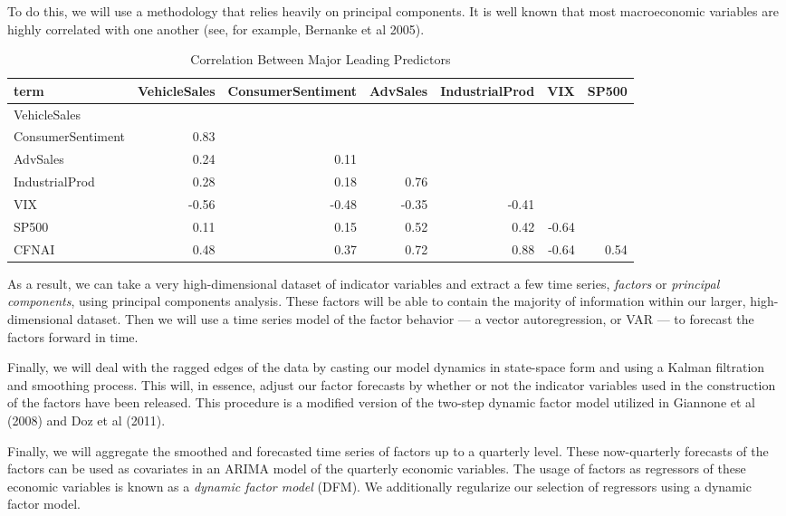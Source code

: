 \documentclass[11pt, letterpaper]{article}\usepackage[]{graphicx}\usepackage[]{color}
\begin{document}
To do this, we will use a methodology that relies heavily on principal components. It is well known that most macroeconomic variables are highly correlated with one another (see, for example, Bernanke et al 2005).
\begin{table}[H]
\centering
\begingroup\scriptsize
\begin{tabular}{lrrrrrr}
  \hline
term & VehicleSales & ConsumerSentiment & AdvSales & IndustrialProd & VIX & SP500 \\ 
  \hline
VehicleSales &  &  &  &  &  &  \\ 
  ConsumerSentiment & 0.83 &  &  &  &  &  \\ 
  AdvSales & 0.24 & 0.11 &  &  &  &  \\ 
  IndustrialProd & 0.28 & 0.18 & 0.76 &  &  &  \\ 
  VIX & -0.56 & -0.48 & -0.35 & -0.41 &  &  \\ 
  SP500 & 0.11 & 0.15 & 0.52 & 0.42 & -0.64 &  \\ 
  CFNAI & 0.48 & 0.37 & 0.72 & 0.88 & -0.64 & 0.54 \\ 
   \hline
\end{tabular}
\endgroup
\caption{Correlation Between Major Leading Predictors} 
\end{table}

As a result, we can take a very high-dimensional dataset of indicator variables and extract a few time series, \textit{factors} or \textit{principal components}, using principal components analysis. These factors will be able to contain the majority of information within our larger, high-dimensional dataset. Then we will use a time series model of the factor behavior --- a vector autoregression, or VAR --- to forecast the factors forward in time. 

Finally, we will deal with the ragged edges of the data by casting our model dynamics in state-space form and using a Kalman filtration and smoothing process. This will, in essence, adjust our factor forecasts by whether or not the indicator variables used in the construction of the factors have been released. This procedure is a modified version of the two-step dynamic factor model utilized in Giannone et al (2008) and Doz et al (2011).

Finally, we will aggregate the smoothed and forecasted time series of factors up to a quarterly level. These now-quarterly forecasts of the factors can be used as covariates in an ARIMA model of the quarterly economic variables. The usage of factors as regressors of these economic variables is known as a \textit{dynamic factor model} (DFM). We additionally regularize our selection of regressors using a dynamic factor model.
\end{document}
